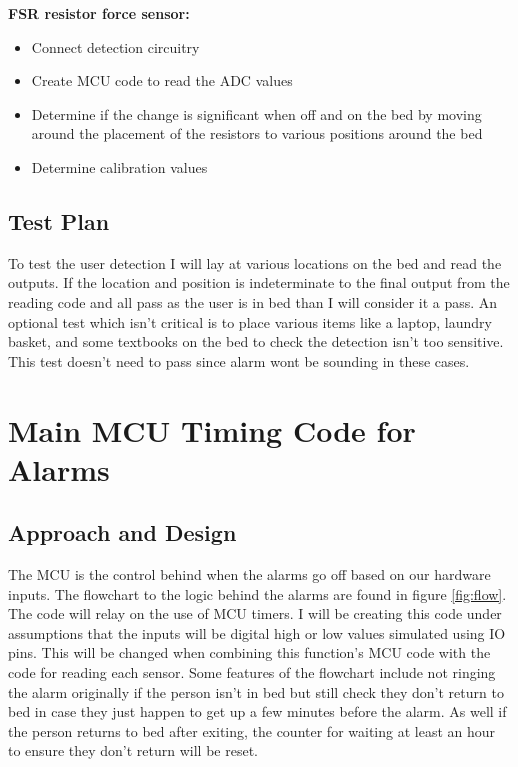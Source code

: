 \documentclass[11pt]{article}
\begin{document}
\textbf{FSR resistor force sensor:}
\begin{itemize}
	\item Connect detection circuitry
	\item Create MCU code to read the ADC values
	\item Determine if the change is significant when off and on the bed by moving around the placement of the resistors to various positions around the bed
	\item Determine calibration values 
\end{itemize}
\subsection*{Test Plan}
To test the user detection I will lay at various locations on the bed and read the outputs.
If the location and position is indeterminate to the final output from the reading code and all pass as the user is in bed than I will consider it a pass. 
An optional test which isn't critical is to place various items like a laptop, laundry basket, and some textbooks on the bed to check the detection isn't too sensitive. 
This test doesn't need to pass since alarm wont be sounding in these cases.

\section{Main MCU Timing Code for Alarms}
\subsection*{Approach and Design}
The MCU is the control behind when the alarms go off based on our hardware inputs. 
The flowchart to the logic behind the alarms are found in figure \ref{fig:flow}.
The code will relay on the use of MCU timers. 
I will be creating this code under assumptions that the inputs will be digital high or low values simulated using IO pins. 
This will be changed when combining this function's MCU code with the code for reading each sensor.
Some features of the flowchart include not ringing the alarm originally if the person isn't in bed but still check they don't return to bed in case they just happen to get up a few minutes before the alarm.
As well if the person returns to bed after exiting, the counter for waiting at least an hour to ensure they don't return will be reset.
\end{document}
